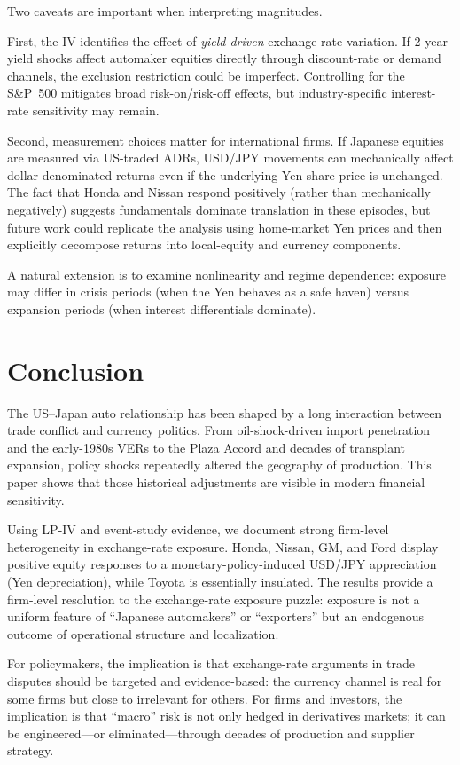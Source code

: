\documentclass[12pt,a4paper]{article}
\begin{document}
Two caveats are important when interpreting magnitudes.

First, the IV identifies the effect of \emph{yield-driven} exchange-rate variation. If 2-year yield shocks affect automaker equities directly through discount-rate or demand channels, the exclusion restriction could be imperfect. Controlling for the S\&P~500 mitigates broad risk-on/risk-off effects, but industry-specific interest-rate sensitivity may remain.

Second, measurement choices matter for international firms. If Japanese equities are measured via US-traded ADRs, USD/JPY movements can mechanically affect dollar-denominated returns even if the underlying Yen share price is unchanged. The fact that Honda and Nissan respond positively (rather than mechanically negatively) suggests fundamentals dominate translation in these episodes, but future work could replicate the analysis using home-market Yen prices and then explicitly decompose returns into local-equity and currency components.

A natural extension is to examine nonlinearity and regime dependence: exposure may differ in crisis periods (when the Yen behaves as a safe haven) versus expansion periods (when interest differentials dominate).

\section{Conclusion}

The US--Japan auto relationship has been shaped by a long interaction between trade conflict and currency politics. From oil-shock-driven import penetration and the early-1980s VERs to the Plaza Accord and decades of transplant expansion, policy shocks repeatedly altered the geography of production. This paper shows that those historical adjustments are visible in modern financial sensitivity.

Using LP-IV and event-study evidence, we document strong firm-level heterogeneity in exchange-rate exposure. Honda, Nissan, GM, and Ford display positive equity responses to a monetary-policy-induced USD/JPY appreciation (Yen depreciation), while Toyota is essentially insulated. The results provide a firm-level resolution to the exchange-rate exposure puzzle: exposure is not a uniform feature of ``Japanese automakers'' or ``exporters'' but an endogenous outcome of operational structure and localization.

For policymakers, the implication is that exchange-rate arguments in trade disputes should be targeted and evidence-based: the currency channel is real for some firms but close to irrelevant for others. For firms and investors, the implication is that ``macro'' risk is not only hedged in derivatives markets; it can be engineered---or eliminated---through decades of production and supplier strategy.




\end{document}
